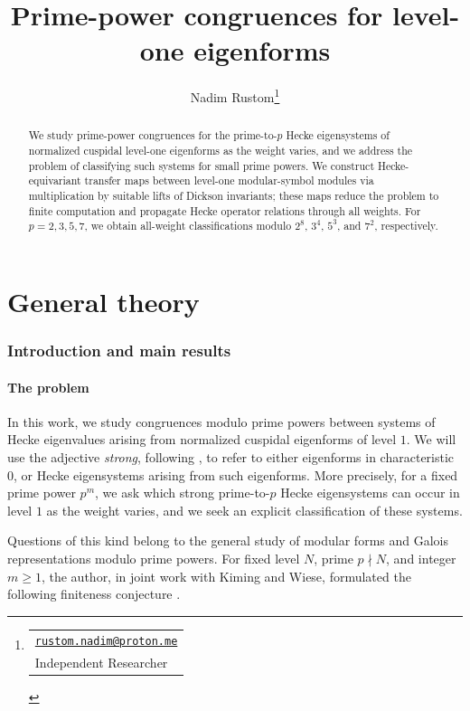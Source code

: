 \documentclass[11pt]{article}
\title{\bfseries Prime-power congruences for level-one eigenforms}
\author{Nadim Rustom\thanks{%
  \begin{tabular}[t]{@{}l@{}}
    \href{mailto:rustom.nadim@proton.me}{\texttt{rustom.nadim@proton.me}}\\
    Independent Researcher
  \end{tabular}}}
\theoremstyle{plain}
\theoremstyle{definition}
\theoremstyle{remark}
\numberwithin{equation}{section}
\begin{document}
\maketitle

\begin{abstract} We study prime-power congruences for the prime-to-\(p\) Hecke eigensystems of normalized cuspidal level-one eigenforms as the weight varies, and we address the problem of classifying such systems for small prime powers. We construct Hecke-equivariant transfer maps between level-one modular-symbol modules via multiplication by suitable lifts of Dickson invariants; these maps reduce the problem to finite computation and propagate Hecke operator relations through all weights. For \(p=2,3,5,7\), we obtain all-weight classifications modulo \(2^8\), \(3^4\), \(5^3\), and \(7^2\), respectively.\end{abstract}

\tableofcontents

\part{General theory}

\section{Introduction and main results}

\subsection{The problem}

In this work, we study congruences modulo prime powers between systems of Hecke eigenvalues arising from normalized cuspidal eigenforms of level \(1\). We will use the adjective \emph{strong}, following \cite{CKW2013,KRW2016}, to refer to either eigenforms in characteristic $0$, or Hecke eigensystems arising from such eigenforms. More precisely, for a fixed prime power \(p^m\), we ask which strong prime-to-\(p\) Hecke eigensystems can occur in level $1$ as the weight varies, and we seek an explicit classification of these systems.

Questions of this kind belong to the general study of modular forms and Galois representations modulo prime powers. For fixed level \(N\), prime \(p\nmid N\), and integer \(m\geq1\), the author, in joint work with Kiming and Wiese, formulated the following finiteness conjecture \cite[Conjecture~1]{KRW2016}.
\end{document}
